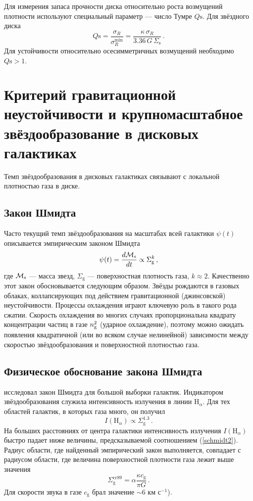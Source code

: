 \documentclass[russian,12pt]{article}
\def\be{\begin{equation}}
\def\ee{\end{equation}}
\begin{document}
Для измерения запаса прочности диска относительно роста возмущений 
плотности используют специальный параметр --- число Тумре $Q\mathrm{s}$. 
Для звёздного диска
\be
Q\mathrm{s} = \frac{\sigma_R}{\sigma_{R}^\mathrm{min}} = 
\frac{\kappa \, \sigma_R}{3.36 \, G \, \Sigma_\mathrm{s}} \, .
\label{toomre_par}
\ee
Для устойчивости относительно осесимметричных возмущений необходимо 
$Q\mathrm{s} >1$. 

\section{Критерий гравитационной неустойчивости и крупномасштабное 
звёздообразование в дисковых галактиках}

Темп звёздообразования в дисковых галактиках связывают с локальной плотностью 
газа в диске.

\subsection{Закон Шмидта}
Часто текущий темп звёздообразования на масштабах всей галактики 
$\psi(t)$ описывается эмпирическим законом Шмидта \citep{Schmidt59}
\be
\psi(t) = \frac{d {\cal M}_\mathrm{s}}{dt} \propto \Sigma_\mathrm{g}^{k} \, ,
\label{schmidt}
\ee
где ${\cal M}_\mathrm{s}$ --- масса звезд, $\Sigma_\mathrm{g}$ ---
поверхностная плотность газа, $k \approx 2$. Качественно этот закон 
обосновывается следующим образом. Звёзды рождаются в газовых облаках, 
коллапсирующих под действием гравитационной (джинсовской) неустойчивости. 
Процессы охлаждения играют ключевую роль в такого рода сжатии. Скорость 
охлаждения во многих случаях пропорциональна квадрату концентрации частиц 
в газе $n_{\rm g}^{2}$ (ударное охлаждение), поэтому можно ожидать появления 
квадратичной (или во всяком случае нелинейной) зависимости между скоростью 
звёздообразования и поверхностной плотностью газа.

\subsection{Физическое обоснование закона Шмидта}
\cite{Kennicutt89} исследовал закон Шмидта для большой выборки галактик. 
Индикатором звёздообразования служила интенсивность излучения в линии 
$\mathrm{H}_{\alpha}$. Для тех областей галактик, в которых газа много, 
он получил
\be
I(\mathrm{H}_{\alpha}) \propto \Sigma_\mathrm{g}^{1.3} \, .
\label{schmidt2}
\ee
На больших расстояниях от центра галактики интенсивность излучения
$I(\mathrm{H}_{\alpha})$ быстро падает ниже величины, предсказываемой
соотношением (\ref{schmidt2}). Радиус области, где найденный
эмпирический закон выполняется, совпадает с радиусом области, где
величина поверхностной плотности газа лежит выше значения
\be
\Sigma_\mathrm{g}^\mathrm{cr89} = \alpha \frac{\kappa c_\mathrm{g}}{\pi G} \, .
\label{kennicutt89}
\ee
Для скорости звука в газе $c_\mathrm{g}$ \cite{Kennicutt89} брал 
значение $\sim 6$ км с$^{-1}$). 
\end{document}
